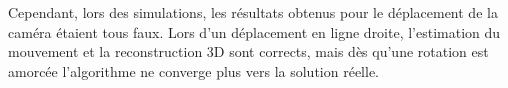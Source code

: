 Cependant, lors des simulations, les résultats obtenus pour le déplacement de la caméra étaient tous faux.
Lors d'un déplacement en ligne droite, l'estimation du mouvement et la reconstruction 3D sont corrects, mais dès qu'une rotation est amorcée l'algorithme ne converge plus vers la solution réelle.


